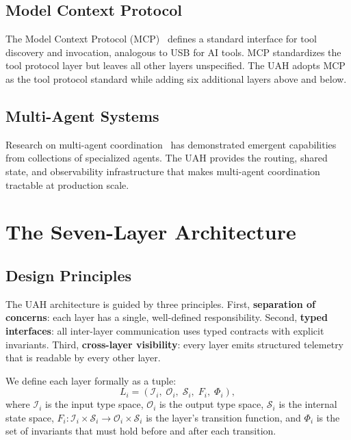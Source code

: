 \documentclass[11pt]{article}
\begin{document}
\subsection{Model Context Protocol}

The Model Context Protocol (MCP)~\cite{mcp2024} defines a standard interface
for tool discovery and invocation, analogous to USB for AI tools. MCP
standardizes the tool protocol layer but leaves all other layers unspecified.
The UAH adopts MCP as the tool protocol standard while adding six additional
layers above and below.

\subsection{Multi-Agent Systems}

Research on multi-agent coordination~\cite{park2023generative,
wu2023autogen} has demonstrated emergent capabilities from collections of
specialized agents. The UAH provides the routing, shared state, and
observability infrastructure that makes multi-agent coordination tractable at
production scale.

\section{The Seven-Layer Architecture}
\label{sec:architecture}

\subsection{Design Principles}

The UAH architecture is guided by three principles. First, \textbf{separation
of concerns}: each layer has a single, well-defined responsibility. Second,
\textbf{typed interfaces}: all inter-layer communication uses typed contracts
with explicit invariants. Third, \textbf{cross-layer visibility}: every layer
emits structured telemetry that is readable by every other layer.

We define each layer formally as a tuple:
\begin{equation}
    L_i = \left(\mathcal{I}_i,\; \mathcal{O}_i,\; \mathcal{S}_i,\;
                 F_i,\; \Phi_i\right),
\end{equation}
where $\mathcal{I}_i$ is the input type space, $\mathcal{O}_i$ is the output
type space, $\mathcal{S}_i$ is the internal state space, $F_i :
\mathcal{I}_i \times \mathcal{S}_i \to \mathcal{O}_i \times \mathcal{S}_i$ is
the layer's transition function, and $\Phi_i$ is the set of invariants that
must hold before and after each transition.
\end{document}
